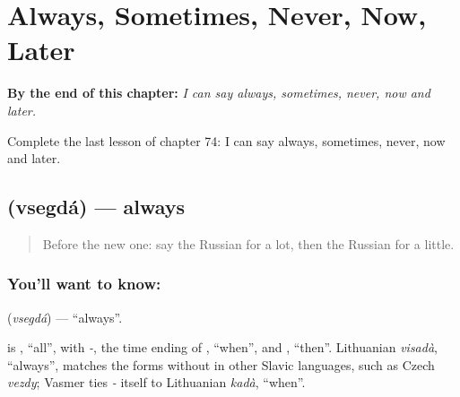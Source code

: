 
\chapter{Always, Sometimes, Never, Now, Later}
\label{ch:ru-always-sometimes-never-now-later}

\begin{chapteropening}
\textbf{By the end of this chapter:} \emph{I can say always, sometimes, never, now and later.}

Complete the last lesson of chapter 74: I can say always, sometimes, never, now and later.
\end{chapteropening}

\section[\texorpdfstring{\ru{всегда} (vsegdá)}{всегда (vsegdá)}]{ (vsegdá) — always}

\label{lesson:RU-C74-always}



\begin{quote}
Before the new one: say the Russian for a lot, then the Russian for a little.
\end{quote}

\subsection*{You'll want to know: }
\textbf{} (\emph{vsegdá}) — \textquotedblleft{}always\textquotedblright{}.

\begin{cousinweb}
\textbf{} is \emph{}, \textquotedblleft{}all\textquotedblright{}, with \emph{-}, the time ending of \emph{}, \textquotedblleft{}when\textquotedblright{}, and \emph{}, \textquotedblleft{}then\textquotedblright{}. Lithuanian \emph{visadà}, \textquotedblleft{}always\textquotedblright{}, matches the forms without \emph{} in other Slavic languages, such as Czech \emph{vezdy}; Vasmer ties \emph{-} itself to Lithuanian \emph{kadà}, \textquotedblleft{}when\textquotedblright{}.
\end{cousinweb}

